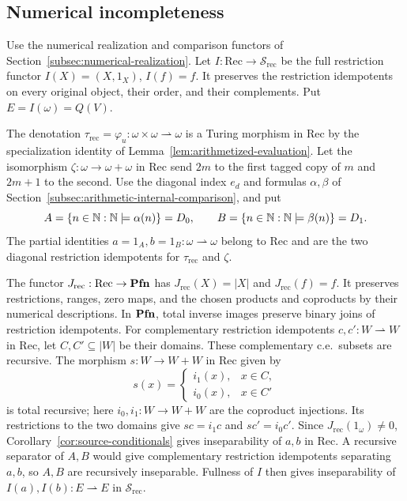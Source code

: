\subsection{Numerical incompleteness}
\label{sec:numerical-incompleteness}
\label{subsec:numerical-incompleteness}

Use the numerical realization and comparison functors of
Section~\ref{subsec:numerical-realization}. Let
$I:\mathrm{Rec}\to\mathscr S_{\mathrm{rec}}$ be the full restriction
functor $I(X)=(X,1_X)$, $I(f)=f$. It preserves the restriction
idempotents on every original object, their order, and their
complements. Put $E=I(\omega)=Q(V)$.

The denotation
$\tau_{\mathrm{rec}}=\varphi_u:\omega\times\omega\rightharpoonup\omega$
is a Turing morphism in $\mathrm{Rec}$ by the specialization identity
of Lemma~\ref{lem:arithmetized-evaluation}. Let the isomorphism
$\zeta:\omega\to\omega+\omega$ in $\mathrm{Rec}$ send $2m$ to
the first tagged copy of $m$ and $2m+1$ to the second. Use the
diagonal index $e_d$ and formulas $\alpha,\beta$ of
Section~\ref{subsec:arithmetic-internal-comparison}, and put
\[
 A=\{n\in\mathbb N:\mathbb N\models\alpha(n)\}=D_0,\qquad
 B=\{n\in\mathbb N:\mathbb N\models\beta(n)\}=D_1.
\]
The partial identities
$a=1_A,b=1_B:\omega\rightharpoonup\omega$ belong to
$\mathrm{Rec}$ and are the two diagonal restriction idempotents
for $\tau_{\mathrm{rec}}$ and $\zeta$.

The functor $J_{\mathrm{rec}}:\mathrm{Rec}\to\mathbf{Pfn}$ has
$J_{\mathrm{rec}}(X)=|X|$ and $J_{\mathrm{rec}}(f)=f$.
It preserves restrictions, ranges, zero maps, and the chosen
products and coproducts by their numerical descriptions.
In $\mathbf{Pfn}$, total inverse images preserve binary joins of restriction
idempotents.
For complementary restriction idempotents $c,c':W\rightharpoonup W$
in $\mathrm{Rec}$, let $C,C'\subseteq|W|$ be their domains. These complementary c.e.\
subsets are recursive. The morphism $s:W\to W+W$ in $\mathrm{Rec}$
given by
\[
 s(x)=
 \begin{cases}
  i_1(x),&x\in C,\\
  i_0(x),&x\in C'
 \end{cases}
\]
is total recursive; here $i_0,i_1:W\to W+W$ are the coproduct
injections. Its restrictions to the two domains give
$sc=i_1c$ and $sc'=i_0c'$. Since $J_{\mathrm{rec}}(1_\omega)\ne0$,
Corollary~\ref{cor:source-conditionals} gives inseparability
of $a,b$ in $\mathrm{Rec}$. A recursive separator of $A,B$ would
give complementary restriction idempotents separating $a,b$, so
$A,B$ are recursively inseparable. Fullness of $I$ then gives
inseparability of $I(a),I(b):E\rightharpoonup E$ in
$\mathscr S_{\mathrm{rec}}$.

